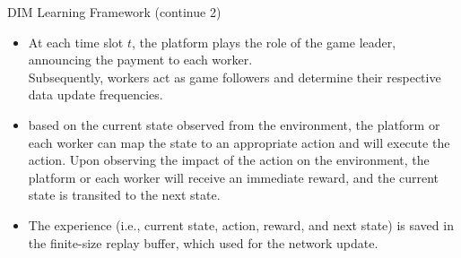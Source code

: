\documentclass[aspectratio=169,xcolor=dvipsnames]{beamer}
\begin{document}
\begin{frame}[fragile]{DIM Learning Framework (continue 2)}
    \footnotesize %
    \begin{itemize}[<+-| alert@+>]
    \setlength{\itemsep}{1em} %
        \item At each time slot $t$, the platform plays the role of the game leader, announcing the
        payment to each worker.\\ Subsequently, workers act as game followers and determine their respective data update frequencies.
        \item based on the current state observed from the environment, the platform or each worker can map the state to an appropriate action and will execute the action. Upon observing the impact of the action on the environment, the platform or each worker will receive an immediate reward, and the current state is transited to the next state.
        \item The experience (i.e., current state, action, reward, and next state) is saved in the finite-size replay buffer, which used for the network update.
    \end{itemize}
\end{frame}
\end{document}
